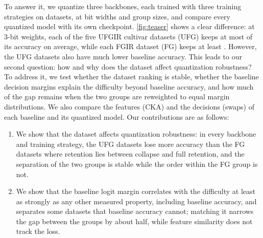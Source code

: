To answer it, we quantize three backbones, each trained with three training strategies on  datasets, at  bit widths and  group sizes, and compare every quantized model with its own checkpoint.
\cref{fig:teaser} shows a clear difference: at 3-bit weights, each of the five UFGIR cultivar datasets (UFG) keeps at most  of its accuracy on average, while each FGIR dataset (FG) keeps at least .
However, the UFG datasets also have much lower baseline accuracy.
This leads to our second question: how and why does the dataset affect quantization robustness?
To address it, we test whether the dataset ranking is stable, whether the baseline decision margins explain the difficulty beyond baseline accuracy, and how much of the gap remains when the two groups are reweighted to equal margin distributions.
We also compare the features (CKA) and the decisions (swaps) of each baseline and its quantized model.
Our contributions are as follows:
\begin{enumerate}
  \item We show that the dataset affects quantization robustness: in every backbone and training strategy, the UFG datasets lose more accuracy than the FG datasets where retention lies between collapse and full retention, and the separation of the two groups is stable while the order within the FG group is not.
  \item We show that the baseline logit margin correlates with the difficulty at least as strongly as any other measured property, including baseline accuracy, and separates some datasets that baseline accuracy cannot; matching it narrows the gap between the groups by about half, while feature similarity does not track the loss.
\end{enumerate}
